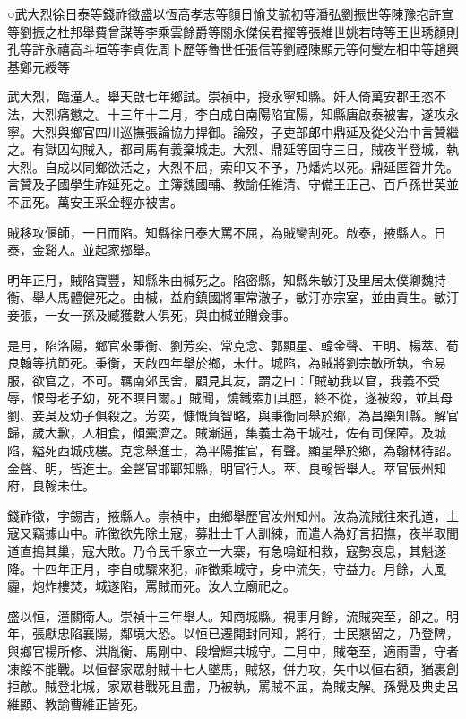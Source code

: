 
\begin{pinyinscope}
○武大烈徐日泰等錢祚徵盛以恆高孝志等顏日愉艾毓初等潘弘劉振世等陳豫抱許宣等劉振之杜邦舉費曾謀等李乘雲餘爵等關永傑侯君擢等張維世姚若時等王世琇顏則孔等許永禧高斗垣等李貞佐周卜歷等魯世任張信等劉禋陳顯元等何燮左相申等趙興基鄭元綬等

武大烈，臨潼人。舉天啟七年鄉試。崇禎中，授永寧知縣。奸人倚萬安郡王恣不法，大烈痛懲之。十三年十二月，李自成自南陽陷宜陽，知縣唐啟泰被害，遂攻永寧。大烈與鄉官四川巡撫張論協力捍御。論歿，子吏部郎中鼎延及從父治中言贊繼之。有獄囚勾賊入，都司馬有義棄城走。大烈、鼎延等固守三日，賊夜半登城，執大烈。自成以同鄉欲活之，大烈不屈，索印又不予，乃燔灼以死。鼎延匿眢井免。言贊及子國學生祚延死之。主簿魏國輔、教諭任維清、守備王正己、百戶孫世英並不屈死。萬安王采金輕亦被害。

賊移攻偃師，一日而陷。知縣徐日泰大罵不屈，為賊臠割死。啟泰，掖縣人。日泰，金谿人。並起家鄉舉。

明年正月，賊陷寶豐，知縣朱由椷死之。陷密縣，知縣朱敏汀及里居太僕卿魏持衡、舉人馬體健死之。由椷，益府鎮國將軍常澈子，敏汀亦宗室，並由貢生。敏汀妾張，一女一孫及臧獲數人俱死，與由椷並贈僉事。

是月，陷洛陽，鄉官來秉衡、劉芳奕、常克念、郭顯星、韓金聲、王明、楊萃、荀良翰等抗節死。秉衡，天啟四年舉於鄉，未仕。城陷，為賊將劉宗敏所執，令易服，欲官之，不可。羈南郊民舍，顧見其友，謂之曰：「賊勒我以官，我義不受辱，恨母老子幼，死不瞑目爾。」賊聞，燒鐵索加其脛，終不從，遂被殺，並其母劉、妾吳及幼子俱殺之。芳奕，慷慨負智略，與秉衡同舉於鄉，為昌樂知縣。解官歸，歲大歉，人相食，傾橐濟之。賊漸逼，集義士為干城社，佐有司保障。及城陷，縊死西城戍樓。克念舉進士，為平陽推官，有聲。顯星舉於鄉，為翰林待詔。金聲、明，皆進士。金聲官邯鄲知縣，明官行人。萃、良翰皆舉人。萃官辰州知府，良翰未仕。

錢祚徵，字錫吉，掖縣人。崇禎中，由鄉舉歷官汝州知州。汝為流賊往來孔道，土寇又竊據山中。祚徵欲先除土寇，募壯士千人訓練，而遣人為好言招撫，夜半取間道直搗其巢，寇大敗。乃令民千家立一大寨，有急鳴鉦相救，寇勢衰息，其魁遂降。十四年正月，李自成驟來犯，祚徵乘城守，身中流矢，守益力。月餘，大風霾，炮炸樓焚，城遂陷，罵賊而死。汝人立廟祀之。

盛以恒，潼關衛人。崇禎十三年舉人。知商城縣。視事月餘，流賊突至，卻之。明年，張獻忠陷襄陽，鄰境大恐。以恒已遷開封同知，將行，士民懇留之，乃登陴，與鄉官楊所修、洪胤衡、馬剛中、段增輝共城守。二月中，賊奄至，適雨雪，守者凍餒不能戰。以恒督家眾射賊十七人墜馬，賊怒，併力攻，矢中以恒右額，猶裹創拒敵。賊登北城，家眾巷戰死且盡，乃被執，罵賊不屈，為賊支解。孫覺及典史呂維顯、教諭曹維正皆死。


\end{pinyinscope}
